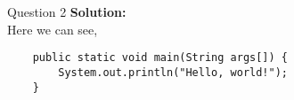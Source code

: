 \item Question 2
\medbreak\noindent\textbf{Solution:}\\
Here we can see,
\begin{verbatim}
    public static void main(String args[]) {
        System.out.println("Hello, world!");
    }
\end{verbatim}